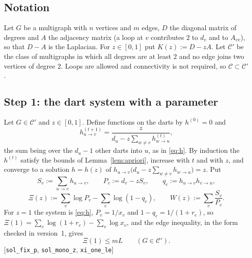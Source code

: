 \documentclass[11pt]{amsart}
\theoremstyle{plain}
\theoremstyle{remark}
\newcommand{\cC}{\mathcal{C}}
\newcommand{\code}[1]{\texttt{#1}}
\begin{document}
\subsection*{Notation}
Let $G$ be a multigraph with $n$ vertices and $m$ edges, $D$ the diagonal matrix of degrees and $A$ the adjacency
matrix (a loop at $v$ contributes $2$ to $d_v$ and to $A_{vv}$), so that $D-A$ is the Laplacian. For $z\in[0,1]$
put $K(z):=D-zA$. Let $\cC'$ be the class of multigraphs in which all degrees are at least $2$ and no edge joins
two vertices of degree $2$. Loops are allowed and connectivity is not required, so $\cC\subset\cC'$.

\subsection*{Step 1: the dart system with a parameter}
Let $G\in\cC'$ and $z\in[0,1]$. Define functions on the darts by $h^{(0)}=0$ and
\begin{equation}\label{eq:hz}
  h^{(t+1)}_{u\to v}=\frac{z}{d_u-z\sum_{w\ne v}h^{(t)}_{w\to u}},
\end{equation}
the sum being over the $d_u-1$ other darts into $u$, as in \eqref{eq:h}. By induction the $h^{(t)}$ satisfy the
bounds of Lemma~\ref{lem:apriori}, increase with $t$ and with $z$, and converge to a solution $h=h(z)$ of
$h_{u\to v}\bigl(d_u-z\sum_{w\ne v}h_{w\to u}\bigr)=z$. Put
\[
  S_v:=\sum_{u\to v}h_{u\to v},\qquad P_v:=d_v-zS_v,\qquad q_e:=h_{u\to v}h_{v\to u},
\]
\[
  \Xi(z):=\sum_v\log P_v-\sum_e\log(1-q_e),\qquad W(z):=\sum_v\frac{S_v}{P_v}.
\]
For $z=1$ the system is \eqref{eq:h}, $P_v=1/x_v$ and $1-q_e=1/(1+r_e)$, so
$\Xi(1)=\sum_e\log(1+r_e)-\sum_v\log x_v$, and the edge inequality, in the form checked in version~1, gives
\begin{equation}\label{eq:xi1}
  \Xi(1)\le mL\qquad(G\in\cC').
\end{equation}
[\code{sol\_fix\_p}, \code{sol\_mono\_z}, \code{xi\_one\_le}]
\end{document}
